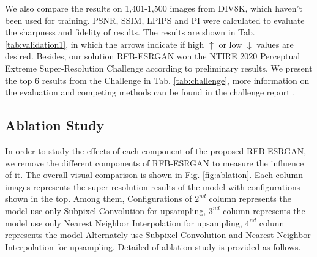 \documentclass[10pt,twocolumn,letterpaper]{article}
\begin{document}
We also compare the results on 1,401-1,500 images from DIV8K, which haven't been used for training. PSNR, SSIM, LPIPS and PI were calculated to evaluate the sharpness and fidelity of results. The results are shown in Tab. \ref{tab:validation1}, in which the arrows indicate if high $\uparrow$ or low $\downarrow$ values are desired. Besides, our solution RFB-ESRGAN won the NTIRE 2020 Perceptual Extreme Super-Resolution Challenge according to preliminary results. We present the top 6 results from the Challenge in Tab. \ref{tab:challenge}, more information on the evaluation and competing methods can be found in the challenge report \cite{zhang2020ntire}.

\begin{table}[htbp]
\centering
{}
\caption{Results of NTIRE 2020 perceptual extreme SR challenge. The PSNR, SSIM, LPIPS and PI are calculated on the center 1,000x1,000 subimages of the DIV8K test images \cite{zhang2020ntire}.}
\label{tab:challenge}
\end{table}


\subsection{Ablation Study}
In order to study the effects of each component of the proposed RFB-ESRGAN, we remove the different components of RFB-ESRGAN to measure the influence of it. The overall visual comparison is shown in Fig. \ref{fig:ablation}. Each column images represents the super resolution results of the model with configurations shown in the top. Among them, Configurations of $2^{nd}$ column represents the model use only Subpixel Convolution for upsampling, $3^{nd}$ column represents the model use only Nearest Neighbor Interpolation for upsampling, $4^{nd}$ colunn represents the model Alternately use Subpixel Convolution and Nearest Neighbor Interpolation for upsampling. Detailed of ablation study is provided as follows.
\end{document}
